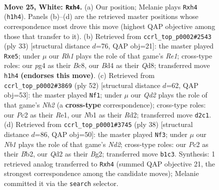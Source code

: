 \documentclass[11pt]{article}
\begin{document}
\clearpage

\begin{figure}[p]\centering
\begin{subfigure}{0.46\textwidth}\centering
\resizebox{\linewidth}{!}{%
\newchessgame
\chessboard[
  setfen={rnb1k1r1/8/4q3/p2p4/1p1B2pp/8/PPPQ1PP1/RN4KR w q - 0 25},
  showmover=false,
  pgfstyle=straightmove, color=movearrow, markmove={h1-h4}
]}
\caption{}
\end{subfigure}\hfill
\begin{subfigure}{0.46\textwidth}\centering
\resizebox{\linewidth}{!}{%
\newchessgame
\chessboard[
  setfen={r1bqr1k1/pp3pp1/7p/2PpPn2/8/2N1PP2/PPQ3BP/R3R1K1 b - - 0 17},
  showmover=false,
  pgfstyle=straightmove, color=movearrow, markmove={e8-e5}
]}
\caption{}
\end{subfigure}
\\[4pt]
\begin{subfigure}{0.46\textwidth}\centering
\resizebox{\linewidth}{!}{%
\newchessgame
\chessboard[
  setfen={r3r1k1/2p5/2p2bq1/2B1pb2/pPP3p1/P7/3RQPPN/4R1K1 w - - 0 27},
  showmover=false,
  pgfstyle=straightmove, color=movearrow, markmove={h2-f1}
]}
\caption{}
\end{subfigure}\hfill
\begin{subfigure}{0.46\textwidth}\centering
\resizebox{\linewidth}{!}{%
\newchessgame
\chessboard[
  setfen={2rk1b1r/3n1ppp/p1q5/Pp1p4/3P4/1Q4P1/1B1N1PBP/4R1K1 w - - 1 20},
  showmover=false,
  pgfstyle=straightmove, color=movearrow, markmove={d2-f3}
]}
\caption{}
\end{subfigure}
\caption{\textbf{Move 25, White: \texttt{Rxh4}.} (a) Our position; Melanie plays \texttt{Rxh4} (\texttt{h1h4}). Panels (b)--(d) are the retrieved master positions whose correspondence most drove this move (highest QAP objective among those that transfer to it). (b) Retrieved from \texttt{ccrl\_top\_p0002\#2543} (ply 33) [structural distance $d$=76, QAP obj=21]: the master played \texttt{Rxe5}; under $\mu$ our \emph{Rh1} plays the role of that game's \emph{Re1}; cross-type roles: our \emph{p}g4 as their \emph{B}c8, our \emph{B}d4 as their \emph{Q}d8; transferred move \texttt{h1h4} \textbf{(endorses this move)}. (c) Retrieved from \texttt{ccrl\_top\_p0002\#3869} (ply 52) [structural distance $d$=62, QAP obj=53]: the master played \texttt{Nf1}; under $\mu$ our \emph{Qd2} plays the role of that game's \emph{Nh2} (a \textbf{cross-type} correspondence); cross-type roles: our \emph{P}c2 as their \emph{R}e1, our \emph{N}b1 as their \emph{R}d2; transferred move \texttt{d2c1}. (d) Retrieved from \texttt{ccrl\_top\_p0001\#3745} (ply 38) [structural distance $d$=86, QAP obj=50]: the master played \texttt{Nf3}; under $\mu$ our \emph{Nb1} plays the role of that game's \emph{Nd2}; cross-type roles: our \emph{P}c2 as their \emph{B}b2, our \emph{Q}d2 as their \emph{B}g2; transferred move \texttt{b1c3}. Synthesis: 1 retrieved analog transferred to \texttt{Rxh4} (summed QAP objective 21, the strongest correspondence among the candidate moves); Melanie committed it via the \texttt{search} selector.}
\label{fig:thought-m48}
\end{figure}
\end{document}
